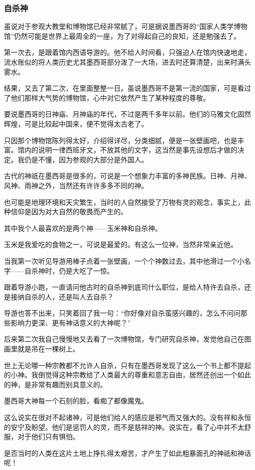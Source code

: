 \subsubsection*{自杀神}
\par 虽说对于参观大教堂和博物馆已经非常腻了，可是据说墨西哥的“国家人类学博物馆”仍然可能是世界上最周全的一座，为了对得起自己的良知，还是勉强去了。
\par 第一次去，是跟着馆内西语导游的。他不给人时间看，只强迫人在馆内快速地走，流水账似的将人类历史尤其墨西哥部分泼了一大场，进去时还算清楚，出来时满头雾水。
\par 结果，又去了第二次，在里面整整一日。虽说墨西哥不是第一流的国家，可是看过了他们那样大气势的博物馆，心中对它依然产生了某种程度的尊敬。
\par 要说墨西哥的日神庙、月神庙的年代，不过是两千多年以前。他们的马雅文化固然辉煌，可是比较起中国来，便不觉得太古老了。
\par 只因那个博物馆陈列得太好，介绍得详尽，分类细腻，便是一张壁画吧，也是丰富。馆内的说明一律西班牙文，不放其他的文字，这当然是事先设想后才做的决定。我仍是不懂，因为参观的大部分是外国人。
\par 古代的神祇在墨西哥是很多的，可说是一个想象力丰富的多神民族。日神、月神、风神、雨神之外，当然还有许许多多不同的神。
\par 也可能是地理环境和天灾繁生，当时的人自然接受了万物有灵的观念，事实上，此种信仰是因为对大自然的敬畏而产生的。
\par 其中我个人最喜欢的是两个神——玉米神和自杀神。
\par 玉米是我爱吃的食物之一，可说是最爱的。有这么一位神，当然非常亲近他。
\par 当我第一次听见导游用棒子点着一张壁画，一个个神数过去，其中他滑过一个小名字——自杀神时，仍是大吃了一惊。
\par 跟着导游小跑，一直请问他古时的自杀神到底司什么职位，是给人特许去自杀，还是接纳自杀的人，还是叫人去自杀？
\par 导游也答不出来，只笑着回了我一句：“你好像对自杀蛮感兴趣的，怎么不问问那些影响力更深、更有神话意义的大神呢？”
\par 后来第二次我自己慢慢地又去看了一次博物馆，专门研究自杀神，发觉他自己在图画里就是吊在一棵树上。
\par 世上无论哪一种宗教都不允许人自杀，只有在墨西哥发现了这么一个书上都不提起的小神。我倒觉得这种宗教给了人类最大的尊重和意志自由，居然还创出一个如此的神，是非常有趣而别具意义的。
\par 墨西哥大神每一个石刻的脸，看痴了都像魔鬼。
\par 这么说实在很对不起诸神，可是他们给人的感应是邪气而又强大的。没有祥和永恒的安宁及盼望。他们是惩罚人的灵，而不是慈祥的神。说实在，看了心中并不太舒服，对于他们只有惧怕。
\par 是否当时的人类在这片土地上挣扎得太艰苦，才产生了如此粗暴面孔的神祇和神话呢！

